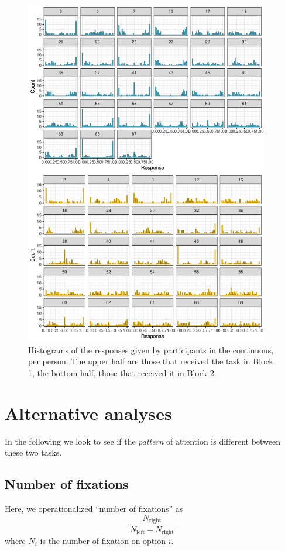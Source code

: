 \documentclass[12pt]{article}
\begin{document}
\begin{figure}[!]
	\centering
	\includegraphics[width=0.95\textwidth]{images/contResponsesPerPpt.pdf}
	\caption{Histograms of the responses given by participants in the continuous, per person. The upper half are those that received the task in Block 1, the bottom half, those that received it in Block 2.}
	\label{figure:contResponsesPerPpt}	
\end{figure}


\clearpage
\newpage
\section{Alternative analyses}
In the following we look to see if the \emph{pattern} of attention is different between these two tasks. 

\subsection{Number of fixations}
Here, we operationalized ``number of fixations'' as 
\begin{equation}
	\frac{N_\text{right}}{N_\text{left}+N_\text{right}}
\end{equation}
where $N_i$ is the number of fixation on option $i$. 
\end{document}
